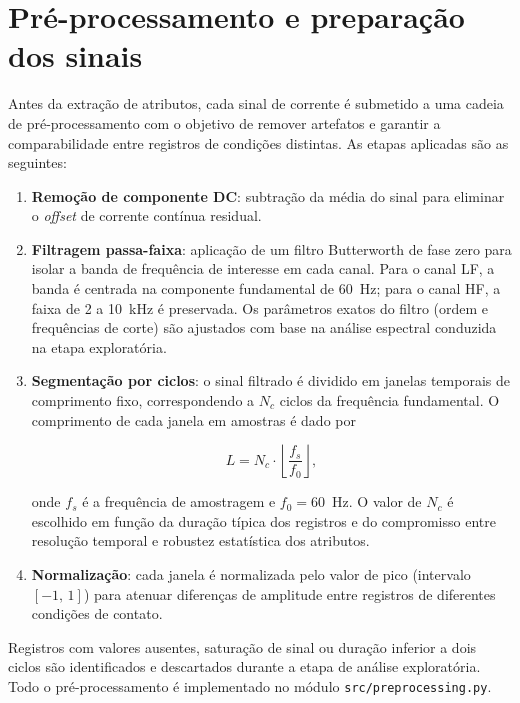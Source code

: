 \section{Pré-processamento e preparação dos sinais}\label{sec:met_preprocessamento}

Antes da extração de atributos, cada sinal de corrente é submetido a uma cadeia de pré-processamento com o objetivo de remover artefatos e garantir a comparabilidade entre registros de condições distintas. As etapas aplicadas são as seguintes:

\begin{enumerate}
    \item \textbf{Remoção de componente DC}: subtração da média do sinal para eliminar o \textit{offset} de corrente contínua residual.

    \item \textbf{Filtragem passa-faixa}: aplicação de um filtro Butterworth de fase zero para isolar a banda de frequência de interesse em cada canal. Para o canal LF, a banda é centrada na componente fundamental de 60~Hz; para o canal HF, a faixa de 2 a 10~kHz é preservada. Os parâmetros exatos do filtro (ordem e frequências de corte) são ajustados com base na análise espectral conduzida na etapa exploratória.

    \item \textbf{Segmentação por ciclos}: o sinal filtrado é dividido em janelas temporais de comprimento fixo, correspondendo a $N_c$ ciclos da frequência fundamental. O comprimento de cada janela em amostras é dado por

    \begin{equation}
        L = N_c \cdot \left\lfloor \frac{f_s}{f_0} \right\rfloor,
        \label{eq:window_length}
    \end{equation}

    onde $f_s$ é a frequência de amostragem e $f_0 = 60$~Hz. O valor de $N_c$ é escolhido em função da duração típica dos registros e do compromisso entre resolução temporal e robustez estatística dos atributos.

    \item \textbf{Normalização}: cada janela é normalizada pelo valor de pico (intervalo $[-1,\,1]$) para atenuar diferenças de amplitude entre registros de diferentes condições de contato.
\end{enumerate}

Registros com valores ausentes, saturação de sinal ou duração inferior a dois ciclos são identificados e descartados durante a etapa de análise exploratória. Todo o pré-processamento é implementado no módulo \texttt{src/preprocessing.py}.

